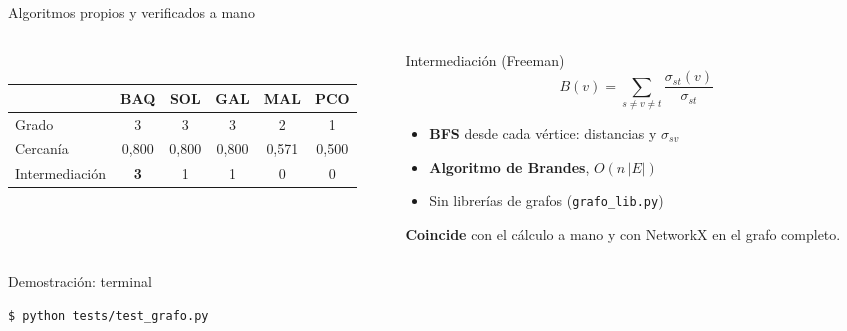 \documentclass[aspectratio=169,10pt]{beamer}
\newcommand{\pB}{Amir Diago}
\newcommand{\orador}{}
\newcommand{\persona}[2]{\renewcommand{\orador}{Persona #1 · #2}}
\begin{document}
\persona{2}{\pB}
\begin{frame}[fragile]{Algoritmos propios y verificados a mano}
  \begin{columns}[T]
    \begin{column}{0.50\textwidth}
      \centering
      \\[4pt]
      \footnotesize
      \begin{tabular}{lccccc}
        \toprule
         & BAQ & SOL & GAL & MAL & PCO\\
        \midrule
        Grado & 3 & 3 & 3 & 2 & 1\\
        Cercanía & 0,800 & 0,800 & 0,800 & 0,571 & 0,500\\
        Intermediación & \textbf{3} & 1 & 1 & 0 & 0\\
        \bottomrule
      \end{tabular}
    \end{column}
    \begin{column}{0.50\textwidth}
      \begin{block}{Intermediación (Freeman)}
        \[B(v)=\sum_{s\neq v\neq t}\frac{\sigma_{st}(v)}{\sigma_{st}}\]
      \end{block}
      \begin{itemize}\setlength\itemsep{2pt}\small
        \item \textbf{BFS} desde cada vértice: distancias y $\sigma_{sv}$
        \item \textbf{Algoritmo de Brandes}, $O(n\,|E|)$
        \item Sin librerías de grafos (\texttt{grafo\_lib.py})
      \end{itemize}
      \alert{\small\textbf{Coincide} con el cálculo a mano y con NetworkX en el grafo completo.}
    \end{column}
  \end{columns}
  \vspace{-6pt}
  \begin{block}{Demostración: terminal}
\footnotesize
\begin{verbatim}
$ python tests/test_grafo.py

\end{verbatim}
\end{block}
\end{frame}
\end{document}
